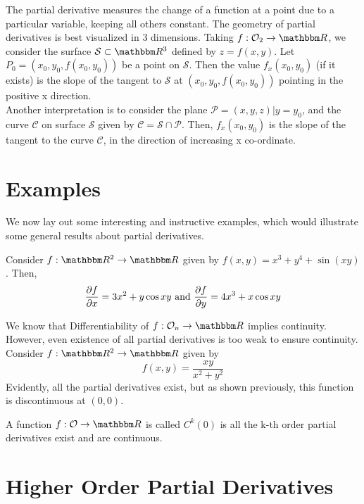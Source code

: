 \documentclass[../Analysis-3]{subfiles}
\begin{document}
The partial derivative measures the change of a function at a point due to a particular variable, keeping all others constant. The geometry of partial derivatives is best visualized in 3 dimensions. Taking $f: \mathcal{O}_2 \to \R$, we consider the surface $\mathcal{S} \subset \R^3$ defined by $z = f(x,y)$. Let $P_0 = (x_0, y_0, f(x_0, y_0))$ be a point on $\mathcal{S}$. Then the value $f_x(x_0, y_0)$ (if it exists) is the slope of the tangent to $\mathcal{S}$ at $(x_0, y_0, f(x_0, y_0))$ pointing in the positive x direction.\\
Another interpretation is to consider the plane $\mathcal{P} = {(x,y,z) | y = y_0}$, and the curve $\mathcal{C}$ on surface $\mathcal{S}$ given by $\mathcal{C} = \mathcal{S} \cap \mathcal{P}$. Then, $f_x(x_0, y_0)$ is the slope of the tangent to the curve $\mathcal{C}$, in the direction of increasing x co-ordinate.
\newpage
\section{Examples}

We now lay out some interesting and instructive examples, which would illustrate some general results about partial derivatives.

\begin{Eg}{}{}
        Consider $f: \R^2 \to \R$ given by $f(x,y) = x^3 + y^4 + \sin(xy)$. Then,
        $$\pdv{f}{x} = 3x^2 + y\cos{xy} \text{ and } \pdv{f}{y} = 4x^3 + x\cos{xy}$$
\end{Eg}

\begin{Eg}{}{}
    We know that Differentiability of $f: \mathcal{O}_n \to \R$ implies continuity. However, even existence of all partial derivatives is too weak to ensure continuity.\\
    Consider $f: \R^2 \to \R$ given by 
    $$f(x,y) = \frac{xy}{x^2 + y^2}$$
    Evidently, all the partial derivatives exist, but as shown previously, this function is discontinuous at $(0,0)$.
\end{Eg}

\begin{Def}{}{}
    A function $f: \mathcal{O} \to \R$ is called $C^k(\mathcal{0})$ is all the k-th order partial derivatives exist and are continuous.
\end{Def}

\section{Higher Order Partial Derivatives}
\end{document}
